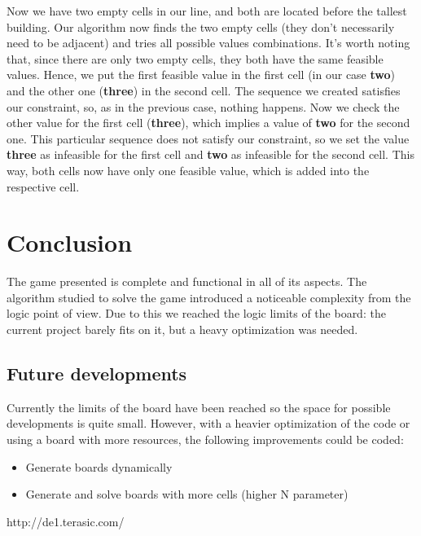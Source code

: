 \documentclass[12pt]{report}
\begin{document}
Now we have two empty cells in our line, and both are located before the tallest
building. Our algorithm now finds the two empty cells (they don't necessarily need
to be adjacent) and tries all possible values combinations. It's worth noting that,
since there are only two empty cells, they both have the same feasible values. Hence,
we put the first feasible value in the first cell (in our case \textbf{two}) and
the other one (\textbf{three}) in the second cell. The sequence we created
satisfies our constraint, so, as in the previous case, nothing happens. Now
we check the other value for the first cell (\textbf{three}), which implies a
value of \textbf{two} for the second one. This particular sequence does not
satisfy our constraint, so we set the value \textbf{three} as infeasible for
the first cell and \textbf{two} as infeasible for the second cell. This way,
both cells now have only one feasible value, which is added into the respective
cell.

\chapter*{Conclusion}

The game presented is complete and functional in all of its aspects. The
algorithm studied to solve the game introduced a noticeable complexity
from the logic point of view. Due to this we reached the logic limits of
the board: the current project barely fits on it, but a heavy optimization
was needed.

\section*{Future developments}

Currently the limits of the board have been reached so the space for
possible developments is quite small. However, with a heavier optimization
of the code or using a board with more resources, the following improvements
could be coded:

\begin{itemize}

    \item Generate boards dynamically
    \item Generate and solve boards with more cells (higher N parameter)

\end{itemize}

\renewcommand{\bibname}{References}
\begin{thebibliography}{100}

 http://de1.terasic.com/

\end{thebibliography}
\end{document}
